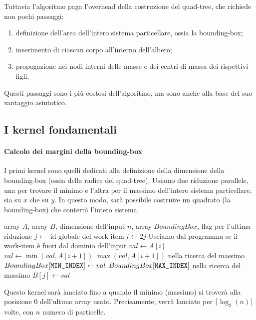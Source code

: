 \documentclass{article}
\begin{document}
Tuttavia l'algoritmo paga l'overhead della costruzione del quad-tree, che richiede non pochi passaggi:
\begin{enumerate}
	\item definizione dell'area dell'intero sistema particellare, ossia la bounding-box;
	\item inserimento di ciascun corpo all'interno dell'albero;
	\item propagazione nei nodi interni delle masse e dei centri di massa dei rispettivi figli.
\end{enumerate}
%
Questi passaggi sono i più costosi dell'algoritmo, ma sono anche alla base del suo vantaggio asintotico.

\newpage
	\subsection{I kernel fondamentali}
	
	\paragraph{Calcolo dei margini della bounding-box}
	I primi kernel sono quelli dedicati alla definizione della dimensione della bounding-box (ossia della radice del quad-tree). Usiamo due riduzione parallele, una per trovare il minimo e l'altra per il massimo dell'intero sistema particellare, sia su $x$ che su $y$. In questo modo, sarà possibile costruire un quadrato (la bounding-box) che conterrà l'intero sistema.
	
	\begin{algorithm}
		\caption{Kernel per la riduzione parallela (ricerca del minimo o massimo)}
		\begin{algorithmic}[1]
			\Require array $A$, array $B$, dimensione dell'input $n$, array $BoundingBox$, flag per l'ultima riduzione
			\State $j \gets$ id globale del work-item
			\State $i \gets 2j$ 
				\Return
				\Comment Usciamo dal programma se il work-item è fuori dal dominio dell'input
			\EndIf
			\State $val \gets A[i]$
			\State $val \gets \min(val, A[i+1])$ \Comment $\max(val, A[i+1])$ nella ricerca del massimo
			\EndIf
			\State $BoundingBox[\verb|MIN_INDEX|] \gets val$ \Comment $BoundingBox[\verb|MAX_INDEX|]$ nella ricerca del massimo
			\EndIf
			\State $B[j] \gets val$
		\end{algorithmic}
	\end{algorithm}
	Questo kernel sarà lanciato fino a quando il minimo (massimo) si troverà alla posizione 0 dell'ultimo array usato. Precisamente, verrà lanciato per $\lceil \log_2(n)\rceil$ volte, con $n$ numero di particelle.
	
\end{document}
